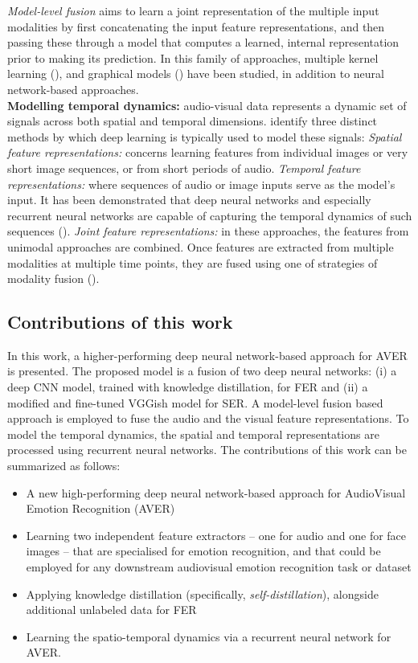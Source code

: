 \documentclass[times,twocolumn,final,authoryear]{elsarticle}
\begin{document}
	\textit{Model-level fusion} aims to learn a joint representation of the multiple input modalities by first concatenating the input feature representations, and then passing these through a model that computes a learned, internal representation prior to making its prediction. In this family of approaches, multiple kernel learning (\cite{chen2014}), and graphical models (\cite{Baltrusaitis2018, Baltrusaitis2013}) have been studied, in addition to neural network-based approaches.\\
	\textbf{Modelling temporal dynamics:} audio-visual data represents a dynamic set of signals across both spatial and temporal dimensions. \cite{RouastSurvey} identify three distinct methods by which deep learning is typically used to model these signals: \textit{Spatial feature representations:} concerns learning features from individual images or very short image sequences, or from short periods of audio. 
	\textit{Temporal feature representations:}  where sequences of audio or image inputs serve as the model's input. It has been demonstrated that deep neural networks and especially recurrent neural networks are capable of capturing the temporal dynamics of such sequences (\cite{Kim2017}). 
	\textit{Joint feature representations:} in these approaches, the features from unimodal approaches are combined. Once features are extracted from multiple modalities at multiple time points, they are fused using one of strategies of modality fusion (\cite{Ringeval2015}). 
	
	
	\subsection{Contributions of this work}
	
	In this work, a higher-performing deep neural network-based approach for AVER is presented. The proposed model is a fusion of two deep neural networks: (i) a deep CNN model, trained with knowledge distillation, for FER and (ii) a modified and fine-tuned VGGish model for SER. A model-level fusion based approach is employed to fuse the audio and the visual feature representations. To model the temporal dynamics, the spatial and temporal representations are processed using recurrent neural networks. 
	The contributions of this work can be summarized as follows:
	\begin{itemize}
		\item A new high-performing deep neural network-based approach for AudioVisual Emotion Recognition (AVER)
		\item Learning two independent feature extractors -- one for audio and one for face images -- that are specialised for emotion recognition, and that could be employed for any downstream audiovisual  emotion  recognition  task or dataset
		\item Applying knowledge distillation (specifically, \emph{self-distillation}), alongside additional unlabeled data for FER
		\item Learning the spatio-temporal dynamics via a recurrent neural network for AVER.
	\end{itemize}
	
\end{document}

